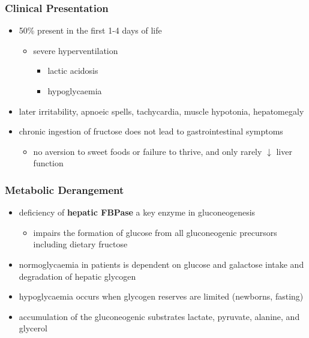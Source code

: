 \documentclass[12pt]{scrartcl}
\begin{document}
\subsubsection{Clinical Presentation}
\label{sec:org3eacf0a}
\begin{itemize}
\item 50\% present in the first 1-4 days of life
\begin{itemize}
\item severe hyperventilation
\begin{itemize}
\item lactic acidosis
\item hypoglycaemia
\end{itemize}
\end{itemize}
\item later irritability, apnoeic spells, tachycardia, muscle hypotonia, hepatomegaly
\item chronic ingestion of fructose does not lead to gastrointestinal symptoms
\begin{itemize}
\item no aversion to sweet foods or failure to thrive, and only rarely \(\downarrow\) liver function
\end{itemize}
\end{itemize}

\subsubsection{Metabolic Derangement}
\label{sec:org037350f}
\begin{itemize}
\item deficiency of \textbf{hepatic FBPase} a key enzyme in gluconeogenesis
\begin{itemize}
\item impairs the formation of glucose from all gluconeogenic precursors
including dietary fructose
\end{itemize}
\end{itemize}

\begin{itemize}
\item normoglycaemia in patients is dependent on glucose and galactose
intake and degradation of hepatic glycogen
\item hypoglycaemia occurs when glycogen reserves are limited (newborns, fasting)
\item accumulation of the gluconeogenic substrates lactate, pyruvate, alanine, and glycerol
\end{itemize}
\end{document}
